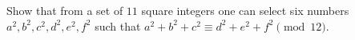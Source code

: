 \begin{problem}
    Show that from a set of $11$ square integers one can select six numbers $a^2,b^2,c^2,d^2,e^2,f^2$ such that $a^2+b^2+c^2 \equiv d^2+e^2+f^2\pmod{12}$.

    \label{15IND1}
\end{problem}